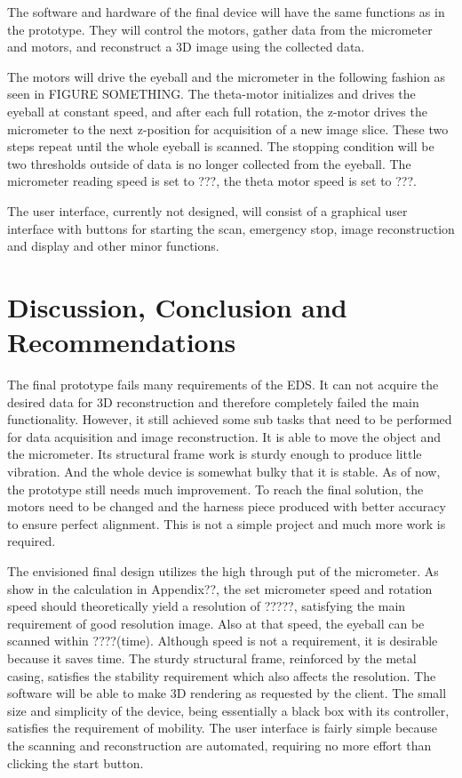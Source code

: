 \documentclass{article}
\begin{document}
The software and hardware of the final device will have the same functions as in the prototype. They will control the motors, gather data from the micrometer and motors, and reconstruct a 3D image using the collected data. 

The motors will drive the eyeball and the micrometer in the following fashion as seen in FIGURE SOMETHING. The theta-motor initializes and drives the eyeball at constant speed, and after each 
full rotation, the z-motor drives the micrometer to the next z-position for acquisition of a new image slice. These two steps repeat until the whole eyeball is scanned. The stopping condition will be two thresholds outside of data is no longer collected from the eyeball. The micrometer reading speed is set to ???, the theta motor speed is set to ???.

The user interface, currently not designed, will consist of a graphical user interface with buttons for starting the scan, emergency stop, image reconstruction and display and other minor functions. 


\section{Discussion, Conclusion and Recommendations}
\label{sec:concl-recomm}

The final prototype fails many requirements of the EDS. It can not acquire the desired data for 3D 
reconstruction and therefore completely failed the main functionality. However, it still achieved some sub 
tasks that need to be performed for data acquisition and image reconstruction. It is able to move the object 
and the micrometer. Its structural frame work is sturdy enough to produce little vibration. And the whole 
device is somewhat bulky that it is stable. As of now, the prototype still needs much improvement. To 
reach the final solution, the motors need to be changed and the harness piece produced with better 
accuracy to ensure perfect alignment. This is not a simple project and much more work is required.

The envisioned final design utilizes the high through put of the micrometer. As show in the calculation in 
Appendix??, the set micrometer speed and rotation speed should theoretically yield a resolution of ?????, 
satisfying the main requirement of good resolution image. Also at that speed, the eyeball can be scanned 
within ????(time). Although speed is not a requirement, it is desirable because it saves time. The sturdy 
structural frame, reinforced by the metal casing, satisfies the stability requirement which also affects the 
resolution. The software will be able to make 3D rendering as requested by the client. The small size and 
simplicity of the device, being essentially a black box with its controller, satisfies the requirement of 
mobility. The user interface is fairly simple because the scanning and reconstruction are automated, 
requiring no more effort than clicking the start button. 
\end{document}
